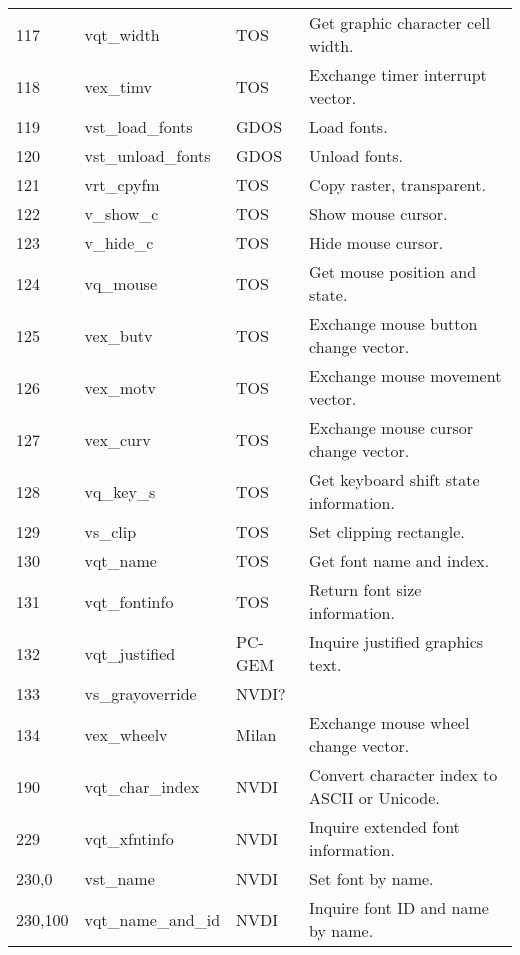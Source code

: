 \documentclass[a4paper]{article}
\begin{document}
\begin{supertabular}{|p{1.8cm}|p{3.0cm}|p{1.5cm}|p{8.7cm}|}
117             & vqt\_width          & TOS   & Get graphic character cell width. \\
118             & vex\_timv           & TOS   & Exchange timer interrupt vector. \\
119             & vst\_load\_fonts    & GDOS  & Load fonts. \\
120             & vst\_unload\_fonts  & GDOS  & Unload fonts. \\
121             & vrt\_cpyfm          & TOS   & Copy raster, transparent. \\
122             & v\_show\_c          & TOS   & Show mouse cursor. \\
123             & v\_hide\_c          & TOS   & Hide mouse cursor. \\
124             & vq\_mouse           & TOS   & Get mouse position and state. \\
125             & vex\_butv           & TOS   & Exchange mouse button change vector. \\
126             & vex\_motv           & TOS   & Exchange mouse movement vector. \\
127             & vex\_curv           & TOS   & Exchange mouse cursor change vector. \\
128             & vq\_key\_s          & TOS   & Get keyboard shift state information. \\
129             & vs\_clip            & TOS   & Set clipping rectangle. \\
130             & vqt\_name           & TOS   & Get font name and index. \\
131             & vqt\_fontinfo       & TOS   & Return font size information. \\
132             & vqt\_justified      & PC-GEM& Inquire justified graphics text.\\
133             & vs\_grayoverride      & NVDI? & \\
134             & vex\_wheelv         & Milan & Exchange mouse wheel change vector. \\
190             & vqt\_char\_index    & NVDI  & Convert character index to ASCII or Unicode. \\
229             & vqt\_xfntinfo       & NVDI  & Inquire extended font information. \\
230,0           & vst\_name           & NVDI  & Set font by name. \\
230,100         & vqt\_name\_and\_id  & NVDI  & Inquire font ID and name by name. \\

\end{supertabular}
\end{document}

